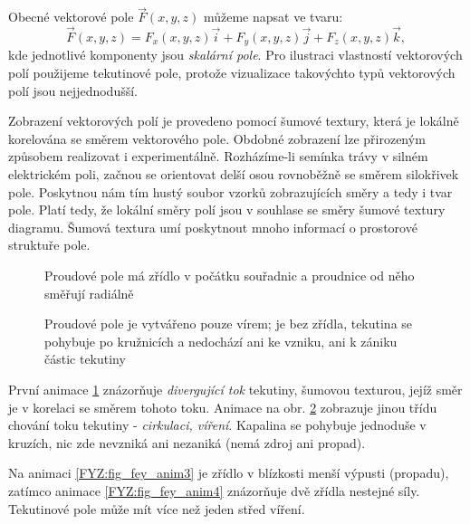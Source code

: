 {    Obecné vektorové pole \(\vec{F}(x, y, z)\) můžeme napsat ve tvaru:
    \begin{equation}
     \vec{F}(x,y,z) = F_x(x,y,z)\vec{i} + F_y(x,y,z)\vec{j} + F_z(x,y,z)\vec{k},
    \end{equation} 
    kde jednotlivé komponenty jsou \emph{skalární pole}. Pro ilustraci vlastností vektorových polí 
    použijeme tekutinové pole, protože vizualizace takovýchto typů vektorových polí jsou 
    nejjednodušší.  
    
    Zobrazení vektorových polí je provedeno pomocí šumové textury, která je lokálně korelována se 
    směrem vektorového pole. Obdobné zobrazení lze přirozeným způsobem realizovat i experimentálně. 
    Rozházíme-li semínka trávy v silném elektrickém poli, začnou se orientovat delší osou 
    rovnoběžně se směrem silokřivek pole. Poskytnou nám tím hustý soubor vzorků zobrazujících směry 
    a tedy i tvar pole. Platí tedy, že lokální směry polí jsou v souhlase se směry šumové textury 
    diagramu. Šumová textura umí poskytnout mnoho informací o prostorové struktuře pole.

    \begin{figure}[ht!]
      \centering
      \caption{Proudové pole má zřídlo v počátku souřadnic a proudnice od něho směřují radiálně} 
      \label{FYZ:fig_fey_anim1}
    \end{figure}

    \begin{figure}[ht!]
      \centering 
      \caption{Proudové pole je vytvářeno pouze vírem; je bez zřídla, tekutina se pohybuje po 
               kružnicích a nedochází ani ke vzniku, ani k zániku částic tekutiny} 
      \label{FYZ:fig_fey_anim2}
    \end{figure}
    
    První animace \ref{FYZ:fig_fey_anim1} znázorňuje \emph{divergující tok} tekutiny, šumovou 
    texturou, jejíž směr je v korelaci se směrem tohoto toku. Animace na obr. 
    \ref{FYZ:fig_fey_anim2} zobrazuje jinou třídu chování toku tekutiny  - \emph{cirkulaci, 
    víření}. Kapalina se pohybuje jednoduše v kruzích, nic zde nevzniká ani nezaniká (nemá zdroj 
    ani propad).   

    Na animaci \ref{FYZ:fig_fey_anim3} je zřídlo v blízkosti menší výpusti (propadu), zatímco 
    animace \ref{FYZ:fig_fey_anim4} znázorňuje dvě zřídla nestejné síly. Tekutinové pole může mít 
    více než jeden střed víření. 

}
